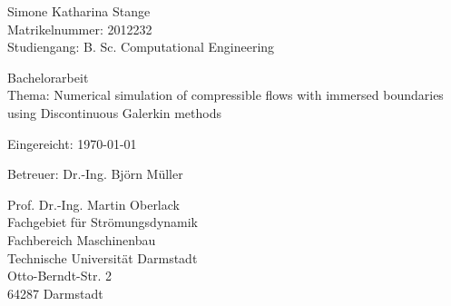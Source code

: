 \vspace*{14cm}
{\parindent0pt
Simone Katharina Stange\\
Matrikelnummer: 2012232 \\
Studiengang: B. Sc. Computational Engineering\newline
 
Bachelorarbeit\\
Thema: Numerical simulation of compressible flows with immersed boundaries using Discontinuous Galerkin methods\newline

Eingereicht: \today\newline

Betreuer: Dr.-Ing. Björn Müller \newline

Prof. Dr.-Ing. Martin Oberlack \\
Fachgebiet für Strömungsdynamik\\
Fachbereich Maschinenbau \\
Technische Universität Darmstadt \\
Otto-Berndt-Str. 2 \\
64287 Darmstadt}